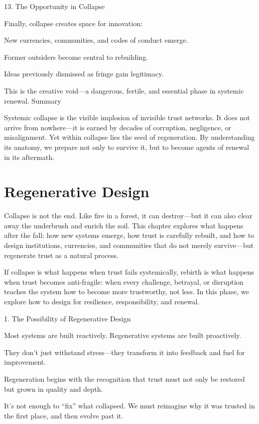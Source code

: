 \documentclass[11pt,oneside]{book}
\begin{document}
13. The Opportunity in Collapse


Finally, collapse creates space for innovation:

    New currencies, communities, and codes of conduct emerge.

    Former outsiders become central to rebuilding.

    Ideas previously dismissed as fringe gain legitimacy.

This is the creative void—a dangerous, fertile, and essential phase in systemic renewal.
Summary

Systemic collapse is the visible implosion of invisible trust networks. It does not arrive from nowhere—it is earned by decades of corruption, negligence, or misalignment. Yet within collapse lies the seed of regeneration. By understanding its anatomy, we prepare not only to survive it, but to become agents of renewal in its aftermath.


\chapter{Regenerative Design}

Collapse is not the end. Like fire in a forest, it can destroy—but it can also clear away the underbrush and enrich the soil. This chapter explores what happens after the fall: how new systems emerge, how trust is carefully rebuilt, and how to design institutions, currencies, and communities that do not merely survive—but regenerate trust as a natural process.

If collapse is what happens when trust fails systemically, rebirth is what happens when trust becomes anti-fragile: when every challenge, betrayal, or disruption teaches the system how to become more trustworthy, not less. In this phase, we explore how to design for resilience, responsibility, and renewal.

1. The Possibility of Regenerative Design


Most systems are built reactively. Regenerative systems are built proactively.

    They don’t just withstand stress—they transform it into feedback and fuel for improvement.

    Regeneration begins with the recognition that trust must not only be restored but grown in quality and depth.

    It’s not enough to “fix” what collapsed. We must reimagine why it was trusted in the first place, and then evolve past it.
\end{document}

